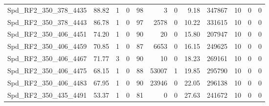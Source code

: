 \begin{longtable}[c]{@{}lrrrrrrrrrrr@{}}
Spd\_RF2\_350\_378\_4435      & 88.82                  & 1                       & 0                       & 98                     & 3                       & 0                       & 9.18                    & 347867                   & 10                       & 0                        & 0                        \\
Spd\_RF2\_350\_378\_4443      & 86.78                  & 1                       & 0                       & 97                     & 2578                    & 0                       & 10.22                   & 331615                   & 10                       & 0                        & 0                        \\
Spd\_RF2\_350\_406\_4451      & 74.20                  & 1                       & 0                       & 90                     & 20                      & 0                       & 15.80                   & 207947                   & 10                       & 0                        & 0                        \\
Spd\_RF2\_350\_406\_4459      & 70.85                  & 1                       & 0                       & 87                     & 6653                    & 0                       & 16.15                   & 249625                   & 10                       & 0                        & 0                        \\
Spd\_RF2\_350\_406\_4467      & 71.77                  & 3                       & 0                       & 90                     & 10                      & 0                       & 18.23                   & 269161                   & 10                       & 0                        & 0                        \\
Spd\_RF2\_350\_406\_4475      & 68.15                  & 1                       & 0                       & 88                     & 53007                   & 1                       & 19.85                   & 295790                   & 10                       & 0                        & 0                        \\
Spd\_RF2\_350\_406\_4483      & 67.95                  & 1                       & 0                       & 90                     & 23946                   & 0                       & 22.05                   & 296138                   & 10                       & 0                        & 0                        \\
Spd\_RF2\_350\_435\_4491      & 53.37                  & 1                       & 0                       & 81                     & 0                       & 0                       & 27.63                   & 241672                   & 10                       & 0                        & 0                        \\

\end{longtable}
